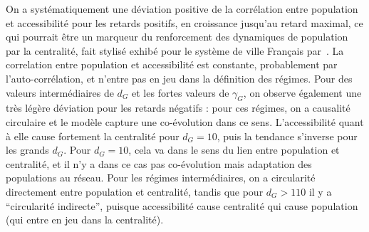 On a systématiquement une déviation positive de la corrélation entre population et accessibilité pour les retards positifs, en croissance jusqu'au retard maximal, ce qui pourrait être un marqueur du renforcement des dynamiques de population par la centralité, fait stylisé exhibé pour le système de ville Français par~\cite{bretagnolle:tel-00459720}. La correlation entre population et accessibilité est constante, probablement par l'auto-corrélation, et n'entre pas en jeu dans la définition des régimes. Pour des valeurs intermédiaires de $d_G$ et les fortes valeurs de $\gamma_G$, on observe également une très légère déviation pour les retards négatifs : pour ces régimes, on a causalité circulaire et le modèle capture une co-évolution dans ce sens. L'accessibilité quant à elle cause fortement la centralité pour $d_G = 10$, puis la tendance s'inverse pour les grands $d_G$. Pour $d_G = 10$, cela va dans le sens du lien entre population et centralité, et il n'y a dans ce cas pas co-évolution mais adaptation des populations au réseau. Pour les régimes intermédiaires, on a circularité directement entre population et centralité, tandis que pour $d_G > 110$ il y a ``circularité indirecte'', puisque accessibilité cause centralité qui cause population (qui entre en jeu dans la centralité).



